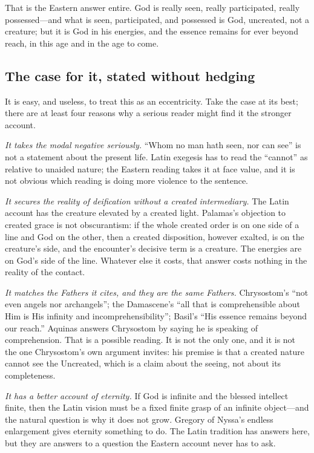 That is the Eastern answer entire. God is really seen, really participated, really possessed---and what is seen, participated, and possessed is God, uncreated, not a creature; but it is God in his energies, and the essence remains for ever beyond reach, in this age and in the age to come.

\subsection{The case for it, stated without hedging}

It is easy, and useless, to treat this as an eccentricity. Take the case at its best; there are at least four reasons why a serious reader might find it the stronger account.

\emph{It takes the modal negative seriously.} ``Whom no man hath seen, nor can see'' is not a statement about the present life. Latin exegesis has to read the ``cannot'' as relative to unaided nature; the Eastern reading takes it at face value, and it is not obvious which reading is doing more violence to the sentence.

\emph{It secures the reality of deification without a created intermediary.} The Latin account has the creature elevated by a created light. Palamas's objection to created grace is not obscurantism: if the whole created order is on one side of a line and God on the other, then a created disposition, however exalted, is on the creature's side, and the encounter's decisive term is a creature. The energies are on God's side of the line. Whatever else it costs, that answer costs nothing in the reality of the contact.

\emph{It matches the Fathers it cites, and they are the same Fathers.} Chrysostom's ``not even angels nor archangels''; the Damascene's ``all that is comprehensible about Him is His infinity and incomprehensibility''; Basil's ``His essence remains beyond our reach.'' Aquinas answers Chrysostom by saying he is speaking of comprehension. That is a possible reading. It is not the only one, and it is not the one Chrysostom's own argument invites: his premise is that a created nature cannot see the Uncreated, which is a claim about the seeing, not about its completeness.

\emph{It has a better account of eternity.} If God is infinite and the blessed intellect finite, then the Latin vision must be a fixed finite grasp of an infinite object---and the natural question is why it does not grow. Gregory of Nyssa's endless enlargement gives eternity something to do. The Latin tradition has answers here, but they are answers to a question the Eastern account never has to ask.

